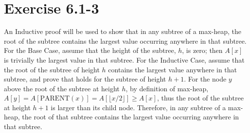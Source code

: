 \documentclass{article}
\begin{document}
\section*{Exercise 6.1-3}

An Inductive proof will be used to show that in any subtree of a max-heap, the root of the subtree contains the largest value occurring anywhere in that subtree. For the Base Case, assume that the height of the subtree, $h$, is zero; then $A[x]$ is trivially the largest value in that subtree. For the Inductive Case, assume that the root of the subtree of height $h$ contains the largest value anywhere in that subtree, and prove that holds for the subtree of height $h + 1$. For the node $y$ above the root of the subtree at height $h$, by definition of max-heap, $A[y] = A[\text{PARENT}(x)] = A[\lfloor x / 2 \rfloor] \geq A[x]$, thus the root of the subtree at height $h + 1$ is larger than its child node. Therefore, in any subtree of a max-heap, the root of that subtree contains the largest value occurring anywhere in that subtree.
\end{document}
